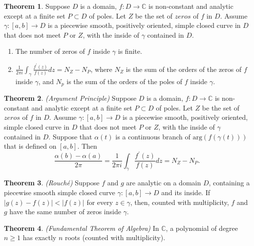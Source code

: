 \documentclass[a4paper]{article}
\theoremstyle{definition}
\newtheorem{theorem}{Theorem}
\begin{document}
	\begin{theorem}
		Suppose $D$ is a domain, $f : D \rightarrow \mathbb{C}$ is non-constant and analytic except at a finite set $P \subset D$ of poles. Let $Z$ be the set of $zeros$ of $f$ in $D$. Assume $\gamma : [a,b] \rightarrow D$ is a piecewise smooth, positively oriented, simple closed curve in $D$ that does not meet $P$ or $Z$, with the inside of $\gamma$ contained in $D$.
		
		\begin{enumerate}[label=\alph*.]
			\item The number of zeros of $f$ inside $\gamma$ is finite.
			\item $\frac{1}{2 \pi i} \int_{\gamma} \frac{f^{\prime}(z)}{f(z)} dz = N_{Z} - N_{P}$, where $N_{Z}$ is the sum of the orders of the zeros of $f$ inside $\gamma$, and $N_{p}$ is the sum of the orders of the poles of $f$ inside $\gamma$.
		\end{enumerate}
	\end{theorem}
	
	\begin{theorem}
		\emph{(Argument Principle)}
		Suppose $D$ is a domain, $f : D \rightarrow \mathbb{C}$ is non-constant and analytic except at a finite set $P \subset D$ of poles. Let $Z$ be the set of $zeros$ of $f$ in $D$. Assume $\gamma : [a,b] \rightarrow D$ is a piecewise smooth, positively oriented, simple closed curve in $D$ that does not meet $P$ or $Z$, with the inside of $\gamma$ contained in $D$. Suppose that $\alpha(t)$ is a continuous branch of $\text{arg}(f(\gamma(t)))$ that is defined on $[a,b]$. Then
		$$\frac{\alpha(b) - \alpha(a)}{2 \pi} = \frac{1}{2 \pi i} \int_{\gamma} \frac{f^{\prime}(z)}{f(z)} dz = N_{Z} - N_{P}.$$
	\end{theorem}
	
	\begin{theorem}
		\emph{(Rouché)}
		Suppose $f$ and $g$ are analytic on a domain $D$, containing a piecewise smooth simple closed curve $\gamma : [a,b] \rightarrow D$ and its inside. If $|g(z) - f(z)| < |f(z)|$ for every $z \in \gamma$, then, counted with multiplicity, $f$ and $g$ have the same number of zeros inside $\gamma$.
	\end{theorem}
	
	\begin{theorem}
		\emph{(Fundamental Theorem of Algebra)}
		In $\mathbb{C}$, a polynomial of degree $n \geq 1$ has exactly $n$ roots (counted with multiplicity).
	\end{theorem}
	
\end{document}
